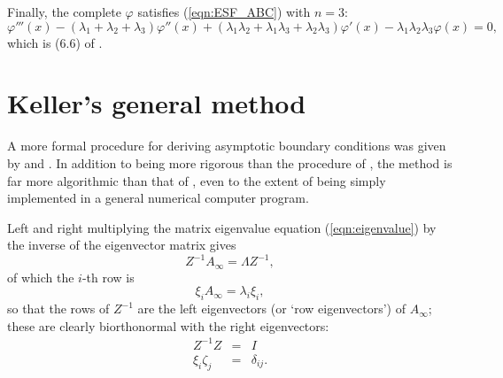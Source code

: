 \documentclass{article}
\begin{document}
Finally, the complete $\varphi$ satisfies (\ref{eqn:ESF_ABC}) with
$n=3$:
\begin{equation}
\varphi'''(x) -
(\lambda_1 + \lambda_2 + \lambda_3) \varphi''(x) +
(\lambda_1\lambda_2 + \lambda_1 \lambda_3 + \lambda_2 \lambda_3)
\varphi'(x) 
- \lambda_1 \lambda_2 \lambda_3 \varphi(x) = 0,\label{eqn:third_ffc}
\end{equation}
which is (6.6) of \citet{Daniels97:JFM-335-57}.

\section{Keller's general method}\label{sec:Keller}

A more formal procedure for deriving asymptotic boundary conditions
was given by \citet[pp.~53--8]{Keller76:NST} and
\citet{Lentini80:SINUM-17-577}.  In addition to being more rigorous than
the procedure of \citet{Gill69:JFM-35-775}, the method is far more
algorithmic than that of \citet{Daniels97:JFM-335-57}, even to the
extent of being simply implemented in a general numerical computer
program.

Left and right multiplying the matrix eigenvalue equation
(\ref{eqn:eigenvalue}) by the inverse of the eigenvector matrix gives
\begin{equation}
Z^{-1} A_\infty  = \Lambda Z^{-1},
\end{equation}
of which the $i$-th row is
\begin{equation}
\xi_i A_\infty  = \lambda_i \xi_i,
\label{eqn:xi}
\end{equation}
so that the rows of $Z^{-1}$ are the left eigenvectors (or `row
eigenvectors') of $A_\infty$; these are clearly biorthonormal with the
right eigenvectors:
\begin{eqnarray}
Z^{-1} Z & = & I \\
\xi_i \zeta_j & = & \delta_{ij}.
\end{eqnarray}
\end{document}

